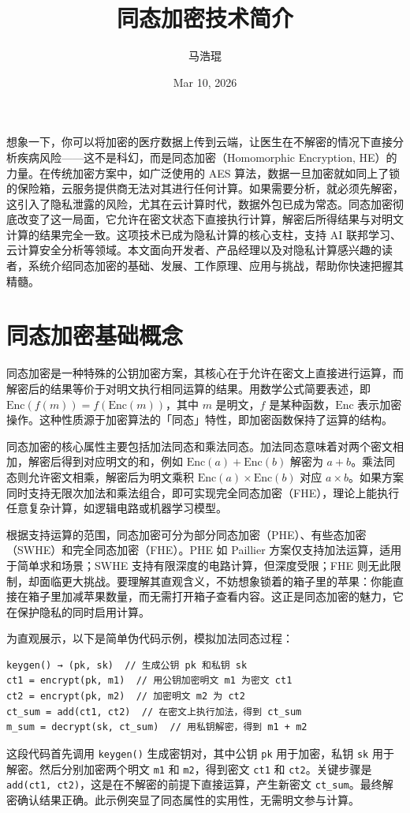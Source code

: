 \title{同态加密技术简介}
\author{马浩琨}
\date{Mar 10, 2026}
\maketitle
想象一下，你可以将加密的医疗数据上传到云端，让医生在不解密的情况下直接分析疾病风险——这不是科幻，而是同态加密（Homomorphic Encryption, HE）的力量。在传统加密方案中，如广泛使用的 AES 算法，数据一旦加密就如同上了锁的保险箱，云服务提供商无法对其进行任何计算。如果需要分析，就必须先解密，这引入了隐私泄露的风险，尤其在云计算时代，数据外包已成为常态。同态加密彻底改变了这一局面，它允许在密文状态下直接执行计算，解密后所得结果与对明文计算的结果完全一致。这项技术已成为隐私计算的核心支柱，支持 AI 联邦学习、云计算安全分析等领域。本文面向开发者、产品经理以及对隐私计算感兴趣的读者，系统介绍同态加密的基础、发展、工作原理、应用与挑战，帮助你快速把握其精髓。\par
\chapter{同态加密基础概念}
同态加密是一种特殊的公钥加密方案，其核心在于允许在密文上直接进行运算，而解密后的结果等价于对明文执行相同运算的结果。用数学公式简要表述，即 $\text{Enc}(f(m)) = f(\text{Enc}(m))$，其中 $m$ 是明文，$f$ 是某种函数，$\text{Enc}$ 表示加密操作。这种性质源于加密算法的「同态」特性，即加密函数保持了运算的结构。\par
同态加密的核心属性主要包括加法同态和乘法同态。加法同态意味着对两个密文相加，解密后得到对应明文的和，例如 $\text{Enc}(a) + \text{Enc}(b)$ 解密为 $a + b$。乘法同态则允许密文相乘，解密后为明文乘积 $\text{Enc}(a) \times \text{Enc}(b)$ 对应 $a \times b$。如果方案同时支持无限次加法和乘法组合，即可实现完全同态加密（FHE），理论上能执行任意复杂计算，如逻辑电路或机器学习模型。\par
根据支持运算的范围，同态加密可分为部分同态加密（PHE）、有些态加密（SWHE）和完全同态加密（FHE）。PHE 如 Paillier 方案仅支持加法运算，适用于简单求和场景；SWHE 支持有限深度的电路计算，但深度受限；FHE 则无此限制，却面临更大挑战。要理解其直观含义，不妨想象锁着的箱子里的苹果：你能直接在箱子里加减苹果数量，而无需打开箱子查看内容。这正是同态加密的魅力，它在保护隐私的同时启用计算。\par
为直观展示，以下是简单伪代码示例，模拟加法同态过程：\par
\begin{lstlisting}
keygen() → (pk, sk)  // 生成公钥 pk 和私钥 sk
ct1 = encrypt(pk, m1)  // 用公钥加密明文 m1 为密文 ct1
ct2 = encrypt(pk, m2)  // 加密明文 m2 为 ct2
ct_sum = add(ct1, ct2)  // 在密文上执行加法，得到 ct_sum
m_sum = decrypt(sk, ct_sum)  // 用私钥解密，得到 m1 + m2
\end{lstlisting}
这段代码首先调用 \texttt{keygen()} 生成密钥对，其中公钥 \texttt{pk} 用于加密，私钥 \texttt{sk} 用于解密。然后分别加密两个明文 \texttt{m1} 和 \texttt{m2}，得到密文 \texttt{ct1} 和 \texttt{ct2}。关键步骤是 \texttt{add(ct1, ct2)}，这是在不解密的前提下直接运算，产生新密文 \texttt{ct\_{}sum}。最终解密确认结果正确。此示例突显了同态属性的实用性，无需明文参与计算。\par
